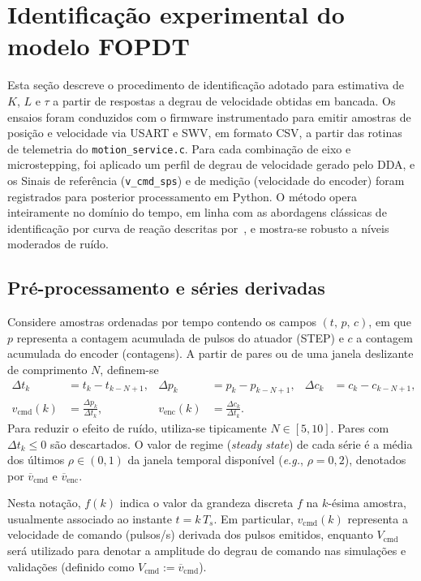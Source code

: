 \section{Identificação experimental do modelo FOPDT}\label{sec:ident_fopdt}

Esta seção descreve o procedimento de identificação adotado para
estimativa de $K$, $L$ e $\tau$ a partir de respostas a degrau de
velocidade obtidas em bancada. Os ensaios foram conduzidos com o firmware
instrumentado para emitir amostras de posição e velocidade via USART e
SWV, em formato CSV, a partir das rotinas de telemetria do
\texttt{motion\_service.c}. Para cada combinação de eixo e microstepping,
foi aplicado um perfil de degrau de velocidade gerado pelo DDA, e os
Sinais de referência (\texttt{v\_cmd\_sps}) e de medição (velocidade do
encoder) foram registrados para posterior processamento em Python. O
método opera inteiramente no domínio do tempo, em linha com as abordagens
clássicas de identificação por curva de reação descritas
por~\cite{astrom1995}, e mostra-se robusto a níveis moderados de ruído.

\subsection{Pré-processamento e séries derivadas}\label{subsec:fopdt_preproc}
Considere amostras ordenadas por tempo contendo os campos $(t,\,p,\,c)$,
em que $p$ representa a contagem acumulada de pulsos do atuador (STEP) e
$c$ a contagem acumulada do encoder (contagens). A partir de pares ou de uma janela
deslizante de comprimento $N$, definem-se
\begin{align}
    \Delta t_k &= t_k - t_{k-N+1}, & \Delta p_k &= p_k - p_{k-N+1}, & \Delta c_k &= c_k - c_{k-N+1},\\
    v_{\mathrm{cmd}}(k) &= \frac{\Delta p_k}{\Delta t_k}, & v_{\mathrm{enc}}(k) &= \frac{\Delta c_k}{\Delta t_k}.
\end{align}
Para reduzir o efeito de ruído, utiliza-se tipicamente $N\in[5,10]$.
Pares com $\Delta t_k\le 0$ são descartados. O valor de regime (\emph{steady
state}) de cada série é a média dos últimos $\rho\in(0,1)$ da janela
temporal disponível (\emph{e.g.}, $\rho=0{,}2$), denotados por
$\overline v_{\mathrm{cmd}}$ e $\overline v_{\mathrm{enc}}$.

Nesta notação, $f(k)$ indica o valor da grandeza discreta $f$
na $k$-ésima amostra, usualmente associado ao instante $t=k\,T_s$. Em
particular, $v_{\mathrm{cmd}}(k)$ representa a velocidade de comando
(pulsos/s) derivada dos pulsos emitidos, enquanto $V_{\mathrm{cmd}}$ será
utilizado para denotar a amplitude do degrau de comando nas simulações e
validações (definido como $V_{\mathrm{cmd}} := \overline v_{\mathrm{cmd}}$).

